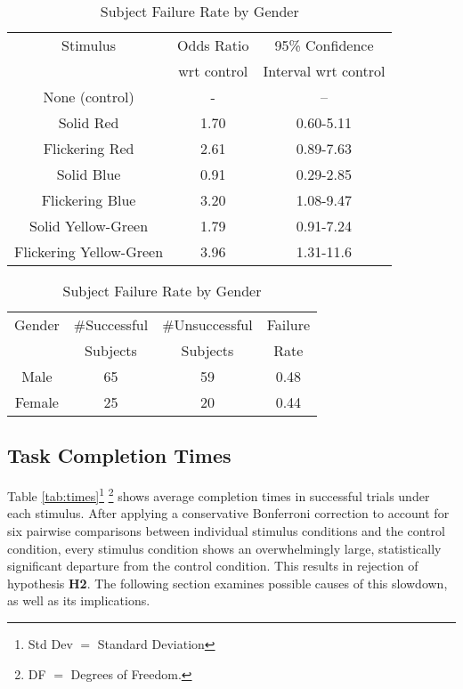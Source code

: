 \documentclass{llncs}
\begin{document}
\begin{table}[!htb]
\parbox{.45\textwidth}{
\smaller
\centering
\caption{\scriptsize Subject Failure Rate by Gender}
\label{tab:Odds}
{\setlength{\extrarowheight}{10pt}
\begin{tabular}{||c|c|c||}
\hline \cline{1-3}
Stimulus &  Odds Ratio  &  95\% Confidence
\vspace*{-0.3cm} \\
	&	wrt control & Interval wrt control
\\ \hline \cline{1-3}
None (control)	& -	& -- 
\\  \hline
Solid Red &	          1.70 &	0.60-5.11
\\ \hline
Flickering Red &	2.61 &	0.89-7.63
\\ \hline
Solid Blue &		0.91 &	0.29-2.85 
\\ \hline
Flickering Blue &           	3.20 & 1.08-9.47 
\\ \hline
Solid Yellow-Green &          1.79 & 0.91-7.24
\\ \hline
Flickering Yellow-Green &           	3.96 & 1.31-11.6
\\ \hline \cline{1-3}
\end{tabular}}
}
\hfill
\parbox{.45\textwidth}{
%
\small
\centering 
\caption{\scriptsize Subject Failure Rate by Gender}
\label{tab:gender}
{\setlength{\extrarowheight}{10pt}
\begin{tabular}{||c|c|c|c||}
\hline \cline{1-4}
Gender &  \#Successful & \#Unsuccessful  & Failure \vspace*{-0.3cm} \\
			 &  Subjects       & Subjects              & Rate
\\ \hline \cline{1-4}
Male	& 65	& 59	& 0.48	
\\  \hline
Female &	       25&	20	& 0.44
\\ \hline \cline{1-4}
\end{tabular}}
}
\end{table}	



\subsection{Task Completion Times}
%
Table \ref{tab:times}\footnote{Std Dev $=$ Standard Deviation} 
\footnote{DF $=$ Degrees of Freedom.} shows average completion times in successful trials 
under each stimulus. 
After applying a conservative Bonferroni correction to account for six pairwise comparisons between 
individual stimulus conditions and the control condition, every stimulus condition shows an overwhelmingly 
large, statistically significant departure 
from the control condition. This results in rejection of hypothesis \textbf{H2}. The following
section examines possible causes of this slowdown, as well as its implications.
%
\end{document}
